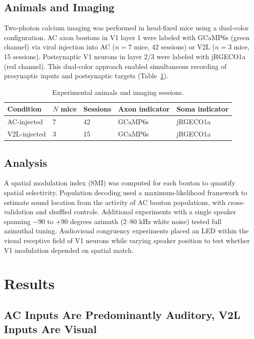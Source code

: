 \documentclass[11pt]{article}
\begin{document}
\subsection{Animals and Imaging}

Two-photon calcium imaging was performed in head-fixed mice using a dual-color configuration. AC axon boutons in V1 layer 1 were labeled with GCaMP6s (green channel) via viral injection into AC ($n = 7$ mice, 42 sessions) or V2L ($n = 3$ mice, 15 sessions). Postsynaptic V1 neurons in layer 2/3 were labeled with jRGECO1a (red channel). This dual-color approach enabled simultaneous recording of presynaptic inputs and postsynaptic targets (Table~\ref{tab:animals}).

\begin{table}[htbp]
\centering
\caption{Experimental animals and imaging sessions.}
\label{tab:animals}
\begin{tabular}{lllll}
\toprule
Condition & $N$ mice & Sessions & Axon indicator & Soma indicator \\
\midrule
AC-injected & 7 & 42 & GCaMP6s & jRGECO1a \\
V2L-injected & 3 & 15 & GCaMP6s & jRGECO1a \\
\bottomrule
\end{tabular}
\end{table}

\subsection{Analysis}

A spatial modulation index (SMI) was computed for each bouton to quantify spatial selectivity. Population decoding used a maximum-likelihood framework to estimate sound location from the activity of AC bouton populations, with cross-validation and shuffled controls. Additional experiments with a single speaker spanning $-$90 to $+$90 degrees azimuth (2--80 kHz white noise) tested full azimuthal tuning. Audiovisual congruency experiments placed an LED within the visual receptive field of V1 neurons while varying speaker position to test whether V1 modulation depended on spatial match.

\section{Results}

\subsection{AC Inputs Are Predominantly Auditory, V2L Inputs Are Visual}
\end{document}
